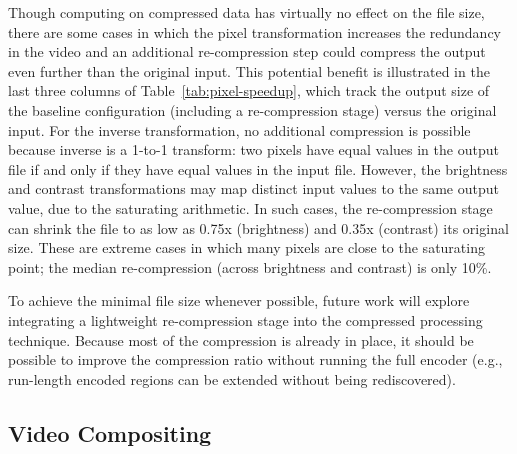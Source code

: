 Though computing on compressed data has virtually no effect on the
file size, there are some cases in which the pixel transformation
increases the redundancy in the video and an additional re-compression
step could compress the output even further than the original input.
This potential benefit is illustrated in the last three columns of
Table~\ref{tab:pixel-speedup}, which track the output size of the
baseline configuration (including a re-compression stage) versus the
original input.  For the inverse transformation, no additional
compression is possible because inverse is a 1-to-1 transform: two
pixels have equal values in the output file if and only if they have
equal values in the input file.  However, the brightness and contrast
transformations may map distinct input values to the same output
value, due to the saturating arithmetic.  In such cases, the
re-compression stage can shrink the file to as low as 0.75x
(brightness) and 0.35x (contrast) its original size.  These are
extreme cases in which many pixels are close to the saturating point;
the median re-compression (across brightness and contrast) is only
10\%.

To achieve the minimal file size whenever possible, future work will
explore integrating a lightweight re-compression stage into the
compressed processing technique.  Because most of the compression is
already in place, it should be possible to improve the compression
ratio without running the full encoder (e.g., run-length encoded
regions can be extended without being rediscovered).  

%

\subsection*{Video Compositing}

